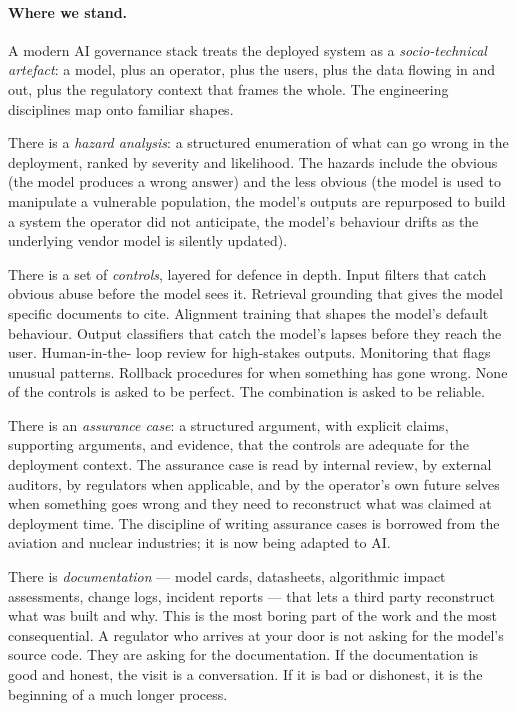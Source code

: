 \paragraph{Where we stand.} A modern AI governance stack treats the deployed system as a
\emph{socio-technical artefact}: a model, plus an operator,
plus the users, plus the data flowing in and out, plus the
regulatory context that frames the whole. The engineering
disciplines map onto familiar shapes.

There is a \emph{hazard analysis}: a structured enumeration of
what can go wrong in the deployment, ranked by severity and
likelihood. The hazards include the obvious (the model
produces a wrong answer) and the less obvious (the model is
used to manipulate a vulnerable population, the model's
outputs are repurposed to build a system the operator did not
anticipate, the model's behaviour drifts as the underlying
vendor model is silently updated).

There is a set of \emph{controls}, layered for defence in
depth. Input filters that catch obvious abuse before the
model sees it. Retrieval grounding that gives the model
specific documents to cite. Alignment training that shapes
the model's default behaviour. Output classifiers that catch
the model's lapses before they reach the user. Human-in-the-
loop review for high-stakes outputs. Monitoring that flags
unusual patterns. Rollback procedures for when something has
gone wrong. None of the controls is asked to be perfect. The
combination is asked to be reliable.

There is an \emph{assurance case}: a structured argument,
with explicit claims, supporting arguments, and evidence,
that the controls are adequate for the deployment context.
The assurance case is read by internal review, by external
auditors, by regulators when applicable, and by the operator's
own future selves when something goes wrong and they need to
reconstruct what was claimed at deployment time. The
discipline of writing assurance cases is borrowed from the
aviation and nuclear industries; it is now being adapted to
AI.

There is \emph{documentation} --- model cards, datasheets,
algorithmic impact assessments, change logs, incident
reports --- that lets a third party reconstruct what was
built and why. This is the most boring part of the work and
the most consequential. A regulator who arrives at your door
is not asking for the model's source code. They are asking
for the documentation. If the documentation is good and
honest, the visit is a conversation. If it is bad or
dishonest, it is the beginning of a much longer process.

